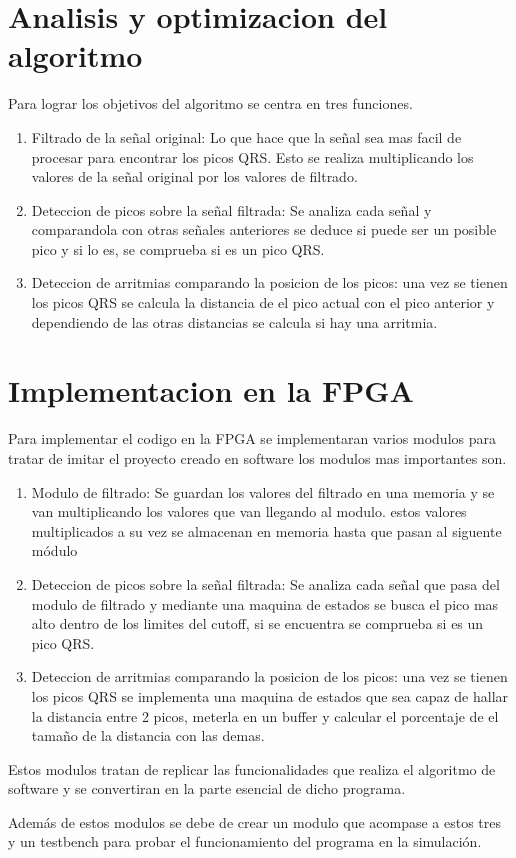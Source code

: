 \section{Analisis y optimizacion del algoritmo}
Para lograr los objetivos del algoritmo se centra en tres funciones.
\begin{enumerate}
	\item Filtrado de la señal original: Lo que hace que la señal sea mas facil de procesar para encontrar los picos QRS.
	 Esto se realiza multiplicando los valores de la señal original por los valores de filtrado.
	\item Deteccion de picos sobre la señal filtrada: Se analiza cada señal y comparandola con otras señales anteriores se
	 deduce si puede ser un posible pico y si lo es, se comprueba si es un pico QRS.
	\item Deteccion de arritmias comparando la posicion de los picos: una vez se tienen los picos QRS se calcula la distancia
	 de el pico actual con el pico anterior y dependiendo de las otras distancias se calcula si hay una arritmia.
\end{enumerate}


\section{Implementacion en la FPGA}
Para implementar el codigo en la FPGA se implementaran varios modulos para tratar de imitar el proyecto creado en software 
los modulos mas importantes son.

	\begin{enumerate}
		\item Modulo de filtrado: Se guardan los valores del filtrado en una memoria y se van multiplicando los valores que van llegando 
		al modulo. estos valores multiplicados a su vez se almacenan en memoria hasta que pasan al siguente módulo
		\item Deteccion de picos sobre la señal filtrada: Se analiza cada señal que pasa del modulo de filtrado y mediante una maquina de estados
		se busca el pico mas alto dentro de los limites del cutoff, si se encuentra se comprueba si es un pico QRS.
		\item Deteccion de arritmias comparando la posicion de los picos: una vez se tienen los picos QRS se implementa una maquina de estados que
		sea capaz de hallar la distancia entre 2 picos, meterla en un buffer y calcular el porcentaje de el tamaño de la distancia con las demas.
	\end{enumerate}

	Estos modulos tratan de replicar las funcionalidades que realiza el algoritmo de software y se convertiran en la parte esencial
	de dicho programa. 
	
	Además de estos modulos se debe de crear un modulo que acompase a estos tres y un testbench para probar el funcionamiento
	del programa en la simulación.